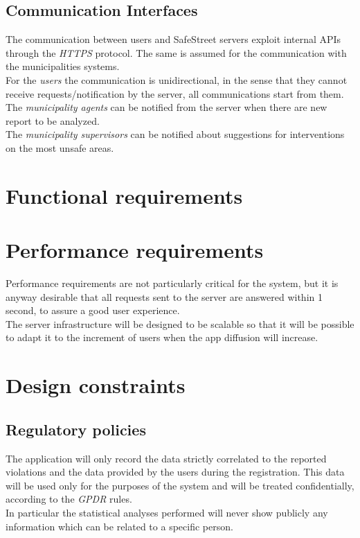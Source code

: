 \documentclass[a4paper]{report}
\begin{document}
\subsection{Communication Interfaces}
The communication between users and SafeStreet servers exploit internal APIs through the \textit{HTTPS} protocol. The same is assumed for the communication with the municipalities systems. \\
For the \textit{users} the communication is unidirectional, in the sense that they cannot receive requests/notification by the server, all communications start from them. \\
The \textit{municipality agents} can be notified from the server when there are new report to be analyzed. \\
The \textit{municipality supervisors} can be notified about suggestions for interventions on the most unsafe areas.
\section{Functional requirements}
\lipsum[1]
\section{Performance requirements}
Performance requirements are not particularly critical for the system, but it is anyway desirable that all requests sent to the server are answered within 1 second, to assure a good user experience. \\
The server infrastructure will be designed to be scalable so that it will be possible to adapt it to the increment of users when the app diffusion will increase.
\section{Design constraints}
\subsection{Regulatory policies}
The application will only record the data strictly correlated to the reported violations and the data provided by the users during the registration. This data will be used only for the purposes of the system and will be treated confidentially, according to the \textit{GPDR} rules.\\
In particular the statistical analyses performed will never show publicly any information which can be related to a specific person.
\end{document}
